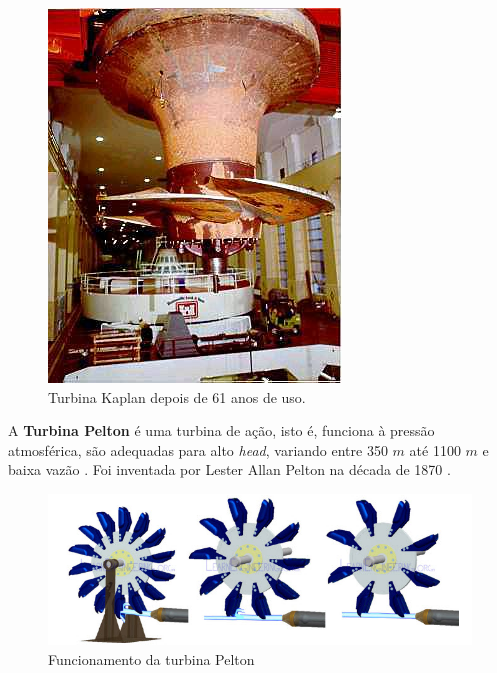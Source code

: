     \begin{figure}[htb]
        \centering
        \caption {\label {fig4:turbina_kaplan} Turbina Kaplan depois de 61 anos de uso. }
        \includegraphics[scale=0.6]{images/fig4.jpg}
    \end{figure}



    A \textbf{Turbina Pelton} é uma turbina de ação, isto é, funciona à pressão atmosférica, são adequadas para alto \textit{head}, variando entre 350 $m$ até 1100 $m$ e baixa vazão \cite{pelton_turbine}. Foi inventada por Lester Allan Pelton na década de 1870 \cite{turbina_pelton}.

    \begin{figure}[htb]
        \centering
        \caption {\label{fig5:turbina_pelton} Funcionamento da turbina Pelton}
        \includegraphics[scale=0.5]{images/fig5.png}
    \end{figure}

